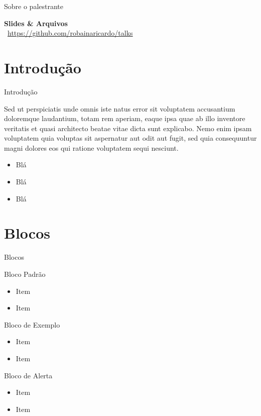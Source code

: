 \documentclass[aspectratio=1610]{beamer}
\begin{document}
\begin{frame}{Sobre o palestrante}
		\\
		
		\centering
		
		\vskip1cm
		
		\textbf{Slides \& Arquivos } \\
		\faGithub\ \url{https://github.com/robainaricardo/talks}
	
		
	\end{frame}

	\section{Introdução}
	
	\begin{frame}{Introdução}
		
		Sed ut perspiciatis unde omnis iste natus error sit voluptatem accusantium doloremque laudantium, totam rem aperiam, eaque ipsa quae ab illo inventore veritatis et quasi architecto beatae vitae dicta sunt explicabo. Nemo enim ipsam voluptatem quia voluptas sit aspernatur aut odit aut fugit, sed quia consequuntur magni dolores eos qui ratione voluptatem sequi nesciunt. 
		
		\begin{itemize}
			\item Blá
			\item Blá
			\item Blá
		\end{itemize}
	
	\end{frame}


	\section{Blocos}
	
	\begin{frame}{Blocos}
	
		\begin{block}{Bloco Padrão}
			\begin{itemize}
				\item Item
				\item Item
			\end{itemize}
		\end{block}
		
		
		\begin{exampleblock}{Bloco de Exemplo}
			\begin{itemize}
				\item Item
				\item Item
			\end{itemize}
		\end{exampleblock}
		
		\begin{alertblock}{Bloco de Alerta}
			\begin{itemize}
				\item Item
				\item Item
			\end{itemize}
		\end{alertblock}
	
	\end{frame}
\end{document}
